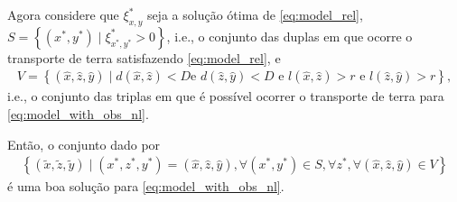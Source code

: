 Agora considere que $\xi_{x, y}^*$ seja a solução ótima de \eqref{eq:model_rel},
$S = \left\{ (x^*, y^*) \mid \xi_{x^*, y^*}^* > 0 \right\}$, i.e., o conjunto
das duplas em que ocorre o transporte de terra satisfazendo \eqref{eq:model_rel},
e
\begin{align*}
    V = \left\{ (\hat{x}, \hat{z}, \hat{y}) \mid d(\hat{x}, \hat{z}) < D \text{
    e } d(\hat{z}, \hat{y}) < D \text{ e } l(\hat{x}, \hat{z}) > r \text{ e }
    l(\hat{z}, \hat{y}) > r \right\},
\end{align*}
i.e., o conjunto das triplas em que é possível ocorrer o transporte de terra
para \eqref{eq:model_with_obs_nl}.

Então, o conjunto dado por
\begin{align*}
    \left\{ (\tilde{x}, \tilde{z}, \tilde{y}) \mid 
    (x^*, z^*, y^*) = (\hat{x}, \hat{z}, \hat{y}), \forall (x^*, y^*) \in S,
    \forall z^*, \forall (\hat{x}, \hat{z}, \hat{y}) \in V \right\}
\end{align*}
é uma boa solução para \eqref{eq:model_with_obs_nl}.
